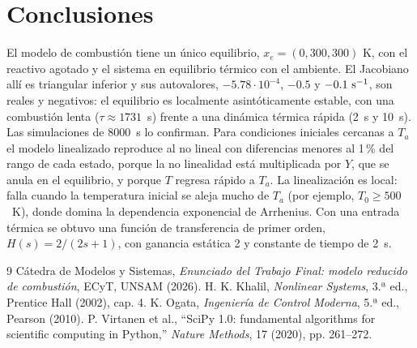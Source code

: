 \documentclass[11pt,a4paper]{article}
\begin{document}
\section{Conclusiones}
El modelo de combustión tiene un único equilibrio, $x_e=(0,300,300)$ K, con el reactivo agotado y el sistema en equilibrio térmico con el ambiente. El Jacobiano allí es triangular inferior y sus autovalores, $-5.78\cdot10^{-4}$, $-0.5$ y $-0.1\ {\rm s}^{-1}$, son reales y negativos: el equilibrio es localmente asintóticamente estable, con una combustión lenta ($\tau\approx1731$~s) frente a una dinámica térmica rápida (2~s y 10~s). Las simulaciones de 8000~s lo confirman.
Para condiciones iniciales cercanas a $T_a$ el modelo linealizado reproduce al no lineal con diferencias menores al 1\,\% del rango de cada estado, porque la no linealidad está multiplicada por $Y$, que se anula en el equilibrio, y porque $T$ regresa rápido a $T_a$. La linealización es local: falla cuando la temperatura inicial se aleja mucho de $T_a$ (por ejemplo, $T_0\ge500$~K), donde domina la dependencia exponencial de Arrhenius. Con una entrada térmica se obtuvo una función de transferencia de primer orden, $H(s)=2/(2s+1)$, con ganancia estática 2 y constante de tiempo de 2~s.
\begin{thebibliography}{9}
 Cátedra de Modelos y Sistemas, \textit{Enunciado del Trabajo Final: modelo reducido de combustión}, ECyT, UNSAM (2026).
 H. K. Khalil, \textit{Nonlinear Systems}, 3.ª ed., Prentice Hall (2002), cap. 4.
 K. Ogata, \textit{Ingeniería de Control Moderna}, 5.ª ed., Pearson (2010).
 P. Virtanen et al., “SciPy 1.0: fundamental algorithms for scientific computing in Python,” \textit{Nature Methods}, 17 (2020), pp. 261--272.
\end{thebibliography}
\end{document}
